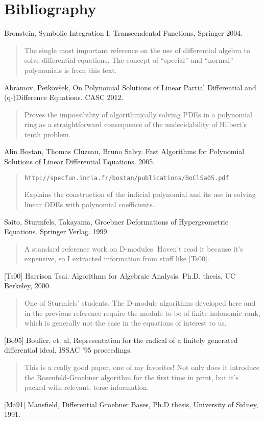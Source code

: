 \documentclass{article}
\begin{document}
\vfill\eject

\section*{Bibliography}

Bronstein, Symbolic Integration I: Transcendental Functions, Springer 2004.

\begin{quote}
The single most important reference on the use of differential
algebra to solve differential equations.  The concept of
``special'' and ``normal'' polynomials is from this text.
\end{quote}

Abramov, Petkov\v sek,
On Polynomial Solutions of Linear Partial
Differential and (q-)Difference Equations.  CASC 2012.

\begin{quote}
Proves the impossibility of algorithmically solving PDEs in a polynomial
ring as a straightforward consequence of the undecidability
of Hilbert's tenth problem.
\end{quote}

Alin Bostan, Thomas Cluzeau, Bruno Salvy.
Fast Algorithms for Polynomial Solutions
of Linear Differential Equations. 2005.

\begin{quote}
{\tt http://specfun.inria.fr/bostan/publications/BoClSa05.pdf}

Explains the construction of the indicial polynomial and its
use in solving linear ODEs with polynomial coefficients.
\end{quote}

Saito, Sturmfels, Takayama, Groebner Deformations of Hypergeometric Equations.
Springer Verlag. 1999.

\begin{quote}
A standard reference work on D-modules.  Haven't read it because it's
expensive, so I extracted information from stuff like [Ts00].
\end{quote}

[Ts00] Harrison Tsai.  Algorithms for Algebraic Analysis.  Ph.D. thesis, UC Berkeley, 2000.

\begin{quote}
One of Sturmfels' students.  The D-module algorithms developed here
and in the previous reference require the module to be of finite
holonomic rank, which is generally not the case in the equations
of interest to us.
\end{quote}

[Bo95] Boulier, et. al, Representation for the radical of a finitely
generated differential ideal.  ISSAC '95 proceedings.

\begin{quote}
This is a really good paper, one of my favorites!  Not only does it
introduce the Rosenfeld-Groebner algorithm for the first time in
print, but it's packed with relevant, terse information.
\end{quote}

[Ma91] Mansfield, Differential Groebner Bases, Ph.D thesis, University
of Sidney, 1991.
\end{document}
